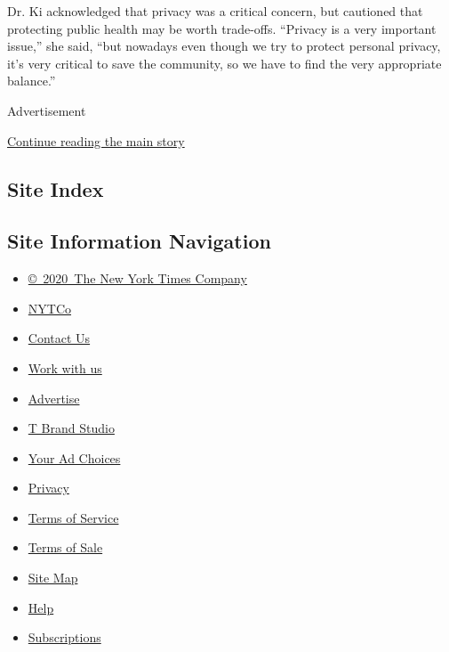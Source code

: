 Dr. Ki acknowledged that privacy was a critical concern, but cautioned
that protecting public health may be worth trade-offs. ``Privacy is a
very important issue,'' she said, ``but nowadays even though we try to
protect personal privacy, it's very critical to save the community, so
we have to find the very appropriate balance.''

Advertisement

\protect\hyperlink{after-bottom}{Continue reading the main story}

\hypertarget{site-index}{%
\subsection{Site Index}\label{site-index}}

\hypertarget{site-information-navigation}{%
\subsection{Site Information
Navigation}\label{site-information-navigation}}

\begin{itemize}
\tightlist
\item
  \href{https://help.nytimes3xbfgragh.onion/hc/en-us/articles/115014792127-Copyright-notice}{©~2020~The
  New York Times Company}
\end{itemize}

\begin{itemize}
\tightlist
\item
  \href{https://www.nytco.com/}{NYTCo}
\item
  \href{https://help.nytimes3xbfgragh.onion/hc/en-us/articles/115015385887-Contact-Us}{Contact
  Us}
\item
  \href{https://www.nytco.com/careers/}{Work with us}
\item
  \href{https://nytmediakit.com/}{Advertise}
\item
  \href{http://www.tbrandstudio.com/}{T Brand Studio}
\item
  \href{https://www.nytimes3xbfgragh.onion/privacy/cookie-policy\#how-do-i-manage-trackers}{Your
  Ad Choices}
\item
  \href{https://www.nytimes3xbfgragh.onion/privacy}{Privacy}
\item
  \href{https://help.nytimes3xbfgragh.onion/hc/en-us/articles/115014893428-Terms-of-service}{Terms
  of Service}
\item
  \href{https://help.nytimes3xbfgragh.onion/hc/en-us/articles/115014893968-Terms-of-sale}{Terms
  of Sale}
\item
  \href{https://spiderbites.nytimes3xbfgragh.onion}{Site Map}
\item
  \href{https://help.nytimes3xbfgragh.onion/hc/en-us}{Help}
\item
  \href{https://www.nytimes3xbfgragh.onion/subscription?campaignId=37WXW}{Subscriptions}
\end{itemize}
